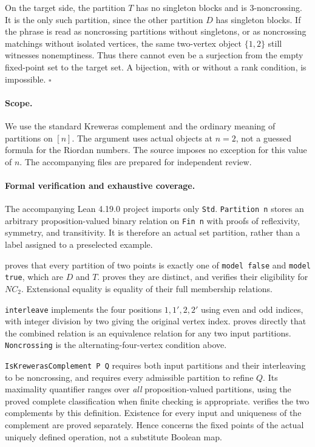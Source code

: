 \documentclass[11pt]{article}
\begin{document}
On the target side, the partition $T$ has no singleton blocks and is
3-noncrossing. It is the only such partition, since the other partition
$D$ has singleton blocks. If the phrase is read as noncrossing partitions
without singletons, or as noncrossing matchings without isolated vertices,
the same two-vertex object $\{1,2\}$ still witnesses nonemptiness.
Thus there cannot even be a surjection from the empty fixed-point set to
the target set. A bijection, with or without a rank condition, is impossible.
\hfill$\square$

\paragraph{Scope.}
We use the standard Kreweras complement and the ordinary meaning of
partitions on $[n]$. The argument uses actual objects at $n=2$, not a
guessed formula for the Riordan numbers. The source imposes no exception
for this value of $n$. The accompanying files are prepared for independent review.

\newpage
\paragraph{Formal verification and exhaustive coverage.}
The accompanying Lean 4.19.0 project imports only \texttt{Std}.
\texttt{Partition n} stores an arbitrary proposition-valued binary
relation on \texttt{Fin n} with proofs of reflexivity, symmetry, and
transitivity. It is therefore an actual set partition, rather than a
label assigned to a preselected example.

 proves that every partition of two
points is exactly one of \texttt{model false} and \texttt{model true},
which are $D$ and $T$.  proves they are distinct,
and  verifies their eligibility for $NC_2$.
Extensional equality is equality of their full membership relations.

\texttt{interleave} implements the four positions $1,1',2,2'$ using
even and odd indices, with integer division by two giving the original
vertex index.  proves directly that the
combined relation is an equivalence relation for any two input partitions.
\texttt{Noncrossing} is the alternating-four-vertex condition above.

\texttt{IsKrewerasComplement P Q} requires both input partitions and
their interleaving to be noncrossing, and requires every admissible
partition to refine $Q$. Its maximality quantifier ranges over
\emph{all} proposition-valued partitions, using the proved complete
classification when finite checking is appropriate.
 verifies the two complements by this definition.
Existence for every input and uniqueness of the complement are proved
separately. Hence  concerns the fixed points of
the actual uniquely defined operation, not a substitute Boolean map.
\end{document}
